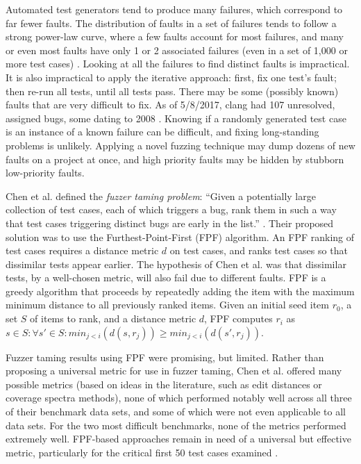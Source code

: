 Automated test generators tend to produce many failures, which correspond to far fewer faults.  The distribution of faults in a set of failures tends to follow a strong power-law curve, where a few faults account for most failures, and many or even most faults have only 1 or 2 associated failures (even in a set of 1,000 or more test cases) \cite{PLDI13,OneTest}.  Looking at all the failures to find  distinct faults is impractical.  It is also impractical to apply the iterative approach:  first, fix one test's fault; then re-run all tests, until all tests pass.  There may be some (possibly known) faults that are very difficult to fix. As of 5/8/2017, clang had 107 unresolved, assigned bugs, some dating to 2008 \cite{clangbugs}.  Knowing if a randomly generated test case is an instance of a known failure can be difficult, and fixing long-standing problems is unlikely.    Applying a novel fuzzing technique \cite{csmith,ISSTA12,ZhendongPLDI} may dump dozens of new faults on a project at once, and high priority faults may be hidden by stubborn low-priority faults.

Chen et al. defined the \emph{fuzzer taming problem}: ``Given a potentially large collection of test cases, each of which triggers a bug, rank them in such a way that test cases triggering distinct bugs are early in the list.'' \cite{PLDI13}.  Their proposed solution was to use the Furthest-Point-First \cite{Gonzalez} (FPF) algorithm.  An FPF ranking of test cases requires a distance metric $d$ on test cases, and ranks test cases so that dissimilar tests appear earlier.  The hypothesis of Chen et al. was that dissimilar tests, by a well-chosen metric, will also fail due to different faults.
FPF is a greedy algorithm that proceeds by repeatedly adding the item with the maximum minimum distance to all previously ranked items. Given an initial seed item $r_0$, a set
$S$ of items to rank, and a distance metric $d$, FPF computes $r_i$ as $s \in S: \forall s' \in S: min_{ j < i}(d(s,r_j)) \geq min_{j < i}(d(s',r_j))$.

Fuzzer taming results using FPF were promising, but limited.  Rather than proposing a universal metric for use in fuzzer taming, Chen et al. offered many possible metrics (based on ideas in the literature, such as edit distances \cite{lev} or coverage spectra \cite{RepsSpectra} methods), none of which performed notably well across all three of their benchmark data sets, and some of which were not even applicable to all data sets.  For the two most difficult benchmarks, none of the metrics performed extremely well. FPF-based approaches remain in need of a universal but effective metric, particularly for the critical first 50 test cases examined \cite{PLDI13}.

